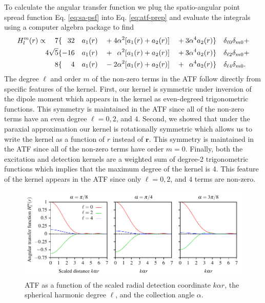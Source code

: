 \documentclass{osa-article}
\providecommand{\mb}[1]{\mathbf{#1}}
\begin{document}
To calculate the angular transfer function we plug the spatio-angular point
spread function Eq. \ref{eq:sa-psf} into Eq. \ref{eq:atf-prep} and evaluate the
integrals using a computer algebra package \cite{meurer2017} to find
\begin{alignat}{6}
  H_l^m(r) \propto \quad 7&\{\hphantom{-}32&&a_1(r)&& + 4\alpha^2[a_1(r) + a_2(r)]&&+ 3\alpha^4a_2(r)\}&&\delta_{\ell 0}\delta_{m0}+\nonumber\\
  4\sqrt{5}&\{-16&&a_1(r)&& + \hphantom{1}\alpha^2[a_1(r) + a_2(r)] &&+ 3\alpha^4a_2(r)\}&&\delta_{\ell 2}\delta_{m0} + \nonumber\\
  8&\{\hphantom{-1}4&&a_1(r)&& - 2\alpha^2[a_1(r) + a_2(r)] &&+ \hphantom{1}\alpha^4a_2(r)\}&&\delta_{\ell 4}\delta_{m0}.
\end{alignat}
The degree $\ell$ and order $m$ of the non-zero terms in the ATF follow directly
from specific features of the kernel. First, our kernel is symmetric under
inversion of the dipole moment which appears in the kernel as even-degreed
trigonometric functions. This symmetry is maintained in the ATF since all of the
non-zero terms have an even degree $\ell=0, 2$, and $4$. Second, we showed that
under the paraxial approximation our kernel is rotationally symmetric which
allows us to write the kernel as a function of $r$ instead of $\mb{r}$. This
symmetry is maintained in the ATF since all of the non-zero terms have order
$m=0$. Finally, both the excitation and detection kernels are a weighted sum of
degree-2 trigonometric functions which implies that the maximum degree of the
kernel is 4. This feature of the kernel appears in the ATF since only
$\ell=0, 2$, and $4$ terms are non-zero. 

\begin{figure}[h]
 \centering
   \centering
   \includegraphics[scale=0.8]{../figures/atf/atf.pdf}
   \caption{ATF as a function of the scaled radial detection coordinate
     $k\alpha r$, the spherical harmonic degree $\ell$, and the collection angle
     $\alpha$. 
   }
   \label{fig:atf}
 \end{figure}
\end{document}
